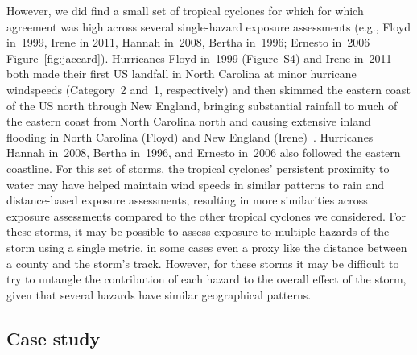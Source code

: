 However, we did find a small set of tropical cyclones for which for which
agreement was high across several single-hazard exposure assessments (e.g.,
Floyd in~1999, Irene in 2011, Hannah in~2008, Bertha in~1996; Ernesto in~2006
Figure~\ref{fig:jaccard}).  Hurricanes Floyd in~1999 (Figure~S4) and Irene
in~2011 both made their first \ac{US} landfall in North Carolina at minor
hurricane windspeeds (Category~2 and~1, respectively) and then skimmed the
eastern coast of the \ac{US} north through New England, bringing substantial
rainfall to much of the eastern coast from North Carolina north and causing
extensive inland flooding in North Carolina (Floyd) and New England
(Irene)~\parencite{avila2013atlantic, lawrence2000atlantic}.  Hurricanes Hannah
in~2008, Bertha in~1996, and Ernesto in~2006 also followed the eastern
coastline. For this set of storms, the tropical cyclones' persistent proximity
to water may have helped maintain wind speeds in similar patterns to rain and
distance-based exposure assessments, resulting in more similarities across
exposure assessments compared to the other tropical cyclones we considered.
For these storms, it may be possible to assess exposure to multiple hazards of
the storm using a single metric, in some cases even a proxy like the distance
between a county and the storm's track.  However, for these storms it may be
difficult to try to untangle the contribution of each hazard to the overall
effect of the storm, given that several hazards have similar geographical
patterns. 

\subsection*{Case study}

